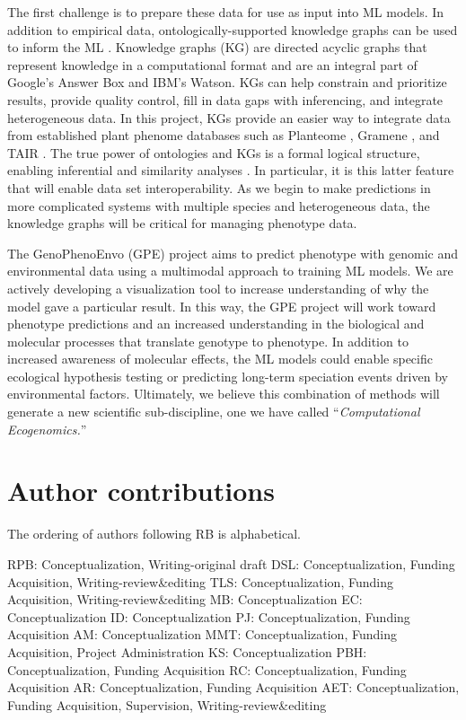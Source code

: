 \documentclass[11pt,]{article}
\begin{document}
The first challenge is to prepare these data for use as input into ML
models. In addition to empirical data, ontologically-supported knowledge
graphs can be used to inform the ML \citep{mungall2017monarch}.
Knowledge graphs (KG) are directed acyclic graphs that represent
knowledge in a computational format and are an integral part of Google's
Answer Box and IBM's Watson. KGs can help constrain and prioritize
results, provide quality control, fill in data gaps with inferencing,
and integrate heterogeneous data. In this project, KGs provide an easier
way to integrate data from established plant phenome databases such as
Planteome \citep{cooper2018planteome}, Gramene
\citep{jaiswalgramene2011}, and TAIR \citep{pooletair2007}. The true
power of ontologies and KGs is a formal logical structure, enabling
inferential and similarity analyses
\citep{mungall2017monarch, washington2009linking}. In particular, it is
this latter feature that will enable data set interoperability. As we
begin to make predictions in more complicated systems with multiple
species and heterogeneous data, the knowledge graphs will be critical
for managing phenotype data.

The GenoPhenoEnvo (GPE) project aims to predict phenotype with genomic
and environmental data using a multimodal approach to training ML
models. We are actively developing a visualization tool to increase
understanding of why the model gave a particular result. In this way,
the GPE project will work toward phenotype predictions and an increased
understanding in the biological and molecular processes that translate
genotype to phenotype. In addition to increased awareness of molecular
effects, the ML models could enable specific ecological hypothesis
testing or predicting long-term speciation events driven by
environmental factors. Ultimately, we believe this combination of
methods will generate a new scientific sub-discipline, one we have
called ``\emph{Computational Ecogenomics.}''

\hypertarget{author-contributions}{%
\section{Author contributions}\label{author-contributions}}

The ordering of authors following RB is alphabetical.

RPB: Conceptualization, Writing-original draft DSL: Conceptualization,
Funding Acquisition, Writing-review\&editing TLS: Conceptualization,
Funding Acquisition, Writing-review\&editing MB: Conceptualization EC:
Conceptualization ID: Conceptualization PJ: Conceptualization, Funding
Acquisition AM: Conceptualization MMT: Conceptualization, Funding
Acquisition, Project Administration KS: Conceptualization PBH:
Conceptualization, Funding Acquisition RC: Conceptualization, Funding
Acquisition AR: Conceptualization, Funding Acquisition AET:
Conceptualization, Funding Acquisition, Supervision,
Writing-review\&editing





\newpage
\singlespacing
\renewcommand\refname{References}

\end{document}
